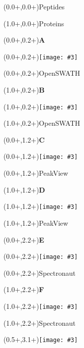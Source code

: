 \documentclass{article}
\newlength{\panelWidth} \newlength{\panelHeight}
\newlength{\labXshift} \newlength{\labYshift}
\newlength{\picXshift} \newlength{\picYshift}
\newlength{\txtXshift} \newlength{\txtYshift}
\newlength{\picWidth}
\newcommand{\txt}[3]{\begin{textblock*}{\panelWidth}(#1+\txtXshift,#2+\txtYshift){#3}\end{textblock*}}
\newcommand{\lab}[3]{\begin{textblock*}{\panelWidth}(#1+\labXshift,#2+\labYshift)\textbf{\LARGE #3}\end{textblock*}}
\newcommand{\pic}[3]{\begin{textblock*}{\panelWidth}(#1+\picXshift,#2+\picYshift)\texttt{[image: \#3]}\end{textblock*}}
\newcommand{\fig}[5]{ \lab{#1}{#2}{#3} \pic{#1}{#2}{#4} \txt{#1}{#2}{#5} }
\begin{document}

\txt{0.0\panelWidth}{0.0\panelHeight}{\LARGE Peptides}
\txt{1.0\panelWidth}{0.0\panelHeight}{\LARGE Proteins}

\fig{0.0\panelWidth}{0.2\panelHeight}{A}{./openSWATH_peptides_r2.pdf}{OpenSWATH}
\fig{1.0\panelWidth}{0.2\panelHeight}{B}{./openSWATH_r2.pdf}{OpenSWATH}
\fig{0.0\panelWidth}{1.2\panelHeight}{C}{./PeakView_peptides_r2.pdf}{PeakView}
\fig{1.0\panelWidth}{1.2\panelHeight}{D}{./PeakView_r2.pdf}{PeakView}
\fig{0.0\panelWidth}{2.2\panelHeight}{E}{./Spectronaut_peptides_r2.pdf}{Spectronaut}
\fig{1.0\panelWidth}{2.2\panelHeight}{F}{./Spectronaut_r2.pdf}{Spectronaut}

\pic{0.5\panelWidth}{3.1\panelHeight}{./species_legend_h.pdf}
\end{document}
